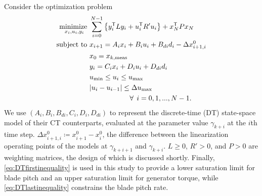 \documentclass[letterpaper, 10 pt, conference]{ieeeconf}  %
\newcommand{\tran}{^{\mathsf{T}}}
\begin{document}
Consider the optimization problem
\begin{align}
\underset{\tiny{x_{i}, u_{i}, y_{i}}}{\text{minimize }} & \sum_{i=0}^{N-1}\left\{ y_{i}\tran L y_{i} + u_{i}\tran R' u_{i} \right\} + x_N\tran P x_N \label{eq:DTcost} \\
\text{subject to } & x_{i+1} = A_{i}x_{i} + B_{i}u_{i} + B_{di}d_{i} - \Delta x^0_{i+1, i} \label{eq:DTdynamics} \\
\empty & x_0 = x_{k,\mathrm{meas}} \label{eq:InitialCond} \\
\empty & y_{i} = C_{i}x_{i} + D_{i}u_{i} + D_{d{i}}d_{i} \label{eq:DToutput} \\
\empty & u_\mathrm{min} \leq u_i \leq u_\mathrm{max} \label{eq:DTfirstinequality} \\
\empty & |u_{i} - u_{i-1}| \leq \Delta u_\mathrm{max} \label{eq:DTlastinequality} \\
\empty & \hspace{20mm} \forall \: \: i = 0,1,...,N-1. \nonumber 
\end{align}
We use $(A_i,B_i,B_{di},C_i,D_i,D_{di})$ to represent the discrete-time (DT) state-space model of their CT counterparts, evaluated at the parameter value $\gamma_{k+i}$ at the $i$th time step. $\Delta x^0_{i+1, i} \coloneqq x^0_{i+1} - x^0_i$, the difference between the linearization operating points of the models at $\gamma_{k+i+1}$ and $\gamma_{k+i}$. $L \geq 0$, $R' > 0$, and $P > 0$ are weighting matrices, the design of which is discussed shortly. Finally, \eqref{eq:DTfirstinequality} is used in this study to provide a lower saturation limit for blade pitch and an upper saturation limit for generator torque, while \eqref{eq:DTlastinequality} constrains the blade pitch rate.
\end{document}
